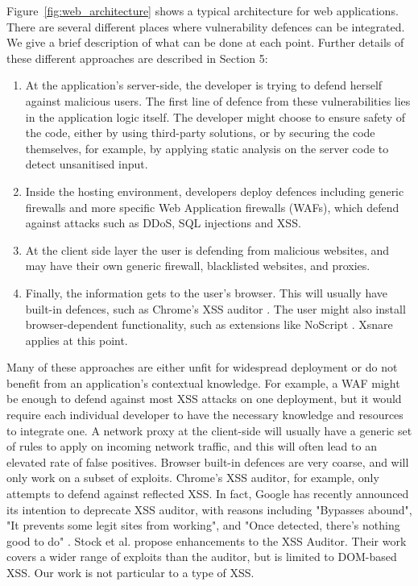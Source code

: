 Figure~\ref{fig:web_architecture} shows a typical architecture for web applications. There are several different places where vulnerability defences can be integrated. We give a brief description of what can be done at each
point. Further details of these different approaches are described in Section 5:
\begin{enumerate}
	\item  At the application's server-side, the developer is trying to defend herself against malicious users. The first line of defence from these vulnerabilities lies in the application logic itself. The developer might choose to ensure safety of the code, either by using third-party solutions, or by securing the code themselves, for example, by applying static analysis on the server code to detect unsanitised input.
	\item Inside the hosting environment, developers deploy defences including generic firewalls and more specific Web Application firewalls (WAFs), which defend against  attacks such as DDoS, SQL injections and XSS.
	\item At the client side layer the user is defending from malicious websites, and may have their own generic firewall, blacklisted websites, and proxies. 
	\item Finally, the information gets to the user's browser. This will usually have built-in defences, such as Chrome's XSS auditor \cite{xssauditor}. The user might also install browser-dependent functionality, such as extensions like NoScript \cite{Noscript}. Xsnare applies at this point.
\end{enumerate}

Many of these approaches are either unfit for widespread deployment or do not benefit from an application's contextual knowledge. For example, a WAF might be enough to defend against most XSS attacks on one deployment, but it would require each individual developer to have the necessary knowledge and resources to integrate one. A network proxy at the client-side will usually have a generic set of rules to apply on incoming network traffic, and this will often lead to an elevated rate of false positives. Browser built-in defences are very coarse, and will only work on a subset of exploits. Chrome's XSS auditor, for example, only attempts to defend against reflected XSS. In fact, Google has recently announced its intention to deprecate XSS auditor, with reasons including "Bypasses abound", "It prevents some legit sites from working", and "Once detected, there’s nothing good to do" \cite{deprecatexssauditor}. Stock et al. \cite{Stock:2017:WTI:3241189.3241265} propose enhancements to the XSS Auditor. Their work covers a wider range of exploits than the auditor, but is limited to DOM-based XSS. Our work is not particular to a type of XSS. 


